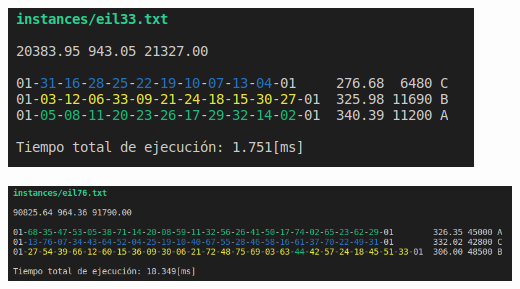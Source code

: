 \begin{center}
    \includegraphics[width=\columnwidth]{imagenes/eil33}
\end{center}
\begin{center}
    \includegraphics[width=\columnwidth]{imagenes/eil76}
\end{center}

